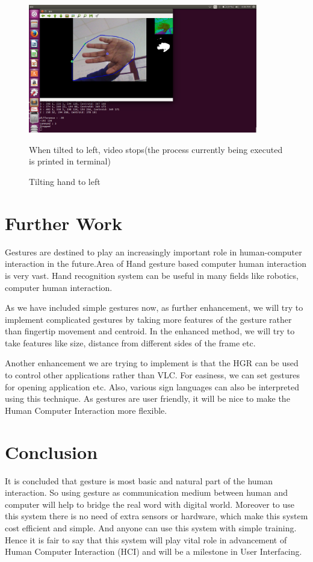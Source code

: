 \documentclass[a4paper,11pt]{article}
\begin{document}
		\begin{figure}[!ht]
			\begin{centering}
				\includegraphics[width=10cm]{images/stop.png}\\
						\caption{Tilting hand to left}
						When tilted to left, video stops(the process currently being executed is printed in terminal)
			\end{centering}
		\end{figure}
		\newpage
		
			
	\section{Further Work}

			Gestures  are  destined  to  play  an  increasingly  important  role  in  human-computer  interaction  in  the future.Area of Hand gesture based computer human interaction is very vast. Hand recognition system can be useful in many fields like robotics, computer human interaction.

			As we have included simple gestures now, as further enhancement, we will try to implement complicated gestures by taking more features of the gesture rather than fingertip movement and centroid. In the enhanced method, we will try to take features like size, distance from different sides of the frame etc. 

			Another enhancement we are trying to implement is that the HGR can be used to control other applications rather than VLC. For easiness, we can set gestures for opening application etc.
			Also, various sign languages can also be interpreted using this technique. As gestures are user friendly, it will be nice to make the Human Computer Interaction more flexible. 
			
	\section{Conclusion}
		It  is  concluded  that  gesture  is  most  basic  and  natural  part of  the  human interaction. So using gesture as communication medium between human and computer will help to bridge the real word with digital world. Moreover to use this system there is no need of extra sensors or hardware, which make this system cost efficient and simple. And anyone can use this system with simple training. Hence it is fair to say that this system will play vital role in advancement of Human Computer Interaction (HCI) and will be a milestone in User Interfacing.
		
\end{document}
